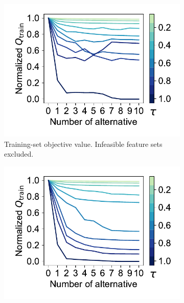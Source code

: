 \documentclass{article}
\theoremstyle{definition}
\begin{document}
\begin{figure}[p]
	\centering
	\begin{subfigure}[t]{0.48\textwidth}
		\centering
		\includegraphics[width=\textwidth, trim=15 17 10 15, clip]{plots/afs-impact-num-alternatives-tau-train-objective-max.pdf}
		\caption{
			Training-set objective value.
			Infeasible feature sets excluded.
		}
		\label{fig:afs:impact-num-alternatives-tau-train-objective-max}
	\end{subfigure}
	\hfill
	\begin{subfigure}[t]{0.48\textwidth}
		\centering
		\includegraphics[width=\textwidth, trim=15 17 10 15, clip]{plots/afs-impact-num-alternatives-tau-train-objective-max-fillna.pdf}
		\caption{
}
\end{subfigure}
\end{figure}
\end{document}
